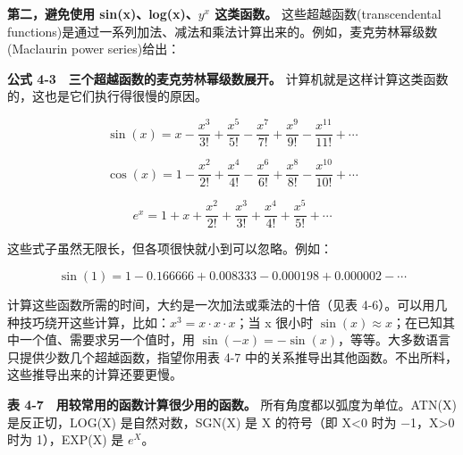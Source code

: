 \textbf{第二，避免使用 sin(x)、log(x)、\(y^x\) 这类函数。}
这些超越函数(transcendental
functions)是通过一系列加法、减法和乘法计算出来的。例如，麦克劳林幂级数(Maclaurin
power series)给出：

\textbf{公式 4-3　三个超越函数的麦克劳林幂级数展开。}
计算机就是这样计算这类函数的，这也是它们执行得很慢的原因。

\[
\sin(x) = x - \frac{x^3}{3!} + \frac{x^5}{5!} - \frac{x^7}{7!} + \frac{x^9}{9!} - \frac{x^{11}}{11!} + \cdots
\]

\[
\cos(x) = 1 - \frac{x^2}{2!} + \frac{x^4}{4!} - \frac{x^6}{6!} + \frac{x^8}{8!} - \frac{x^{10}}{10!} + \cdots
\]

\[
e^x = 1 + x + \frac{x^2}{2!} + \frac{x^3}{3!} + \frac{x^4}{4!} + \frac{x^5}{5!} + \cdots
\]

这些式子虽然无限长，但各项很快就小到可以忽略。例如：

\[
\sin(1) = 1 - 0.166666 + 0.008333 - 0.000198 + 0.000002 - \cdots
\]

计算这些函数所需的时间，大约是一次加法或乘法的十倍（见表
4-6）。可以用几种技巧绕开这些计算，比如：\(x^3 = x \cdot x \cdot x\)；当
x 很小时 \(\sin(x) \approx x\)；在已知其中一个值、需要求另一个值时，用
\(\sin(-x) = -\sin(x)\)，等等。大多数语言只提供少数几个超越函数，指望你用表
4-7 中的关系推导出其他函数。不出所料，这些推导出来的计算还要更慢。

\textbf{表 4-7　用较常用的函数计算很少用的函数。}
所有角度都以弧度为单位。ATN(X) 是反正切，LOG(X) 是自然对数，SGN(X) 是 X
的符号（即 X\textless0 时为 −1，X\textgreater0 时为 1），EXP(X) 是
\(e^X\)。

